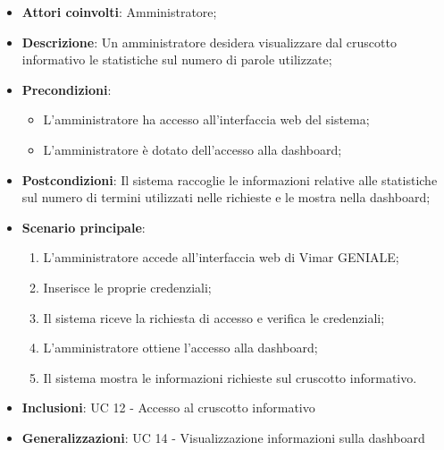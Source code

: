 \begin{itemize}
    \item \textbf{Attori coinvolti}: Amministratore;
    \item \textbf{Descrizione}: Un amministratore desidera visualizzare dal cruscotto informativo le statistiche sul numero di parole utilizzate;
    \item \textbf{Precondizioni}: 
        \begin{itemize}
            \item L’amministratore ha accesso all’interfaccia web del sistema;
            \item L’amministratore è dotato dell’accesso alla dashboard;
        \end{itemize}
    \item \textbf{Postcondizioni}: Il sistema raccoglie le informazioni relative alle statistiche sul numero di termini utilizzati nelle richieste e le mostra nella dashboard;
    \item \textbf{Scenario principale}:
    \begin{enumerate}
    \item L’amministratore accede all’interfaccia web di Vimar GENIALE;
    \item Inserisce le proprie credenziali;
    \item Il sistema riceve la richiesta di accesso e verifica le credenziali;
    \item L’amministratore ottiene l’accesso alla dashboard;
    \item Il sistema mostra le informazioni richieste sul cruscotto informativo.
    \end{enumerate}
    \item \textbf{Inclusioni}: UC 12 - Accesso al cruscotto informativo
    \item \textbf{Generalizzazioni}: UC 14 - Visualizzazione informazioni sulla dashboard
\end{itemize}

